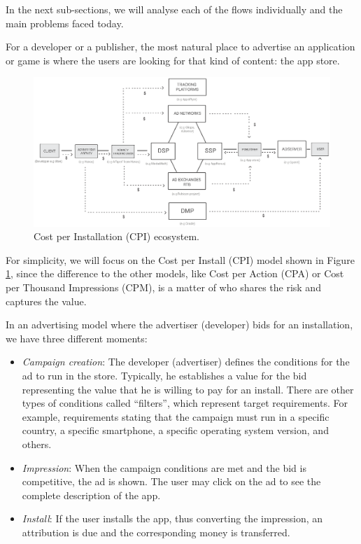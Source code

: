 
In the next sub-sections, we will analyse each of the flows individually and the main problems faced today.

For a developer or a publisher, the most natural place to advertise an application or game is where the users are looking for that kind of content: the app store.

\begin{figure}[!ht]
\centering
\includegraphics[width=\textwidth]{diagrams/cpi_flow.eps}
\caption{Cost per Installation (CPI) ecosystem.}
\label{fig:cpi}
\end{figure}

For simplicity, we will focus on the Cost per Install (CPI) model shown in Figure \ref{fig:cpi}, since the difference to the other models, like Cost per Action (CPA) or Cost per Thousand Impressions (CPM), is a matter of who shares the risk and captures the value.

In an advertising model where the advertiser (developer) bids for an installation, we have three different moments:

\begin{itemize}
\item {\em Campaign creation}: The developer (advertiser) defines the conditions for the ad to run in the store. Typically, he establishes a value for the bid representing the value that he is willing to pay for an install. There are other types of conditions called ``filters'', which represent target requirements. For example, requirements stating that the campaign must run in a specific country, a specific smartphone, a specific operating system version, and others.
\item {\em Impression}: When the campaign conditions are met and the bid is competitive, the ad is shown. The user may click on the ad to see the complete description of the app.
\item {\em Install}: If the user installs the app, thus converting the impression, an attribution is due and the corresponding money is transferred.
\end{itemize}

